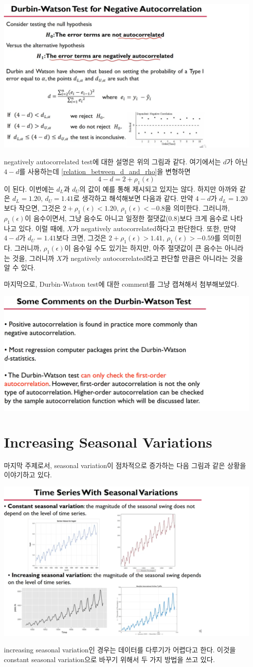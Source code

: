 \documentclass{article}
\begin{document}
\begin{center}
\includegraphics[width=.5\textwidth]{negatively_autocorrelated_test}
\end{center}

negatively autocorrelated test에 대한 설명은 위의 그림과 같다.
여기에서는 \(d\)가 아닌 \(4-d\)를 사용하는데 \eqref{relation_between_d_and_rho}을 변형하면
\[4-d=2+\rho_1(\epsilon)\]
이 된다.
이번에는 \(d_L\)과 \(d_U\)의 값이 예를 통해 제시되고 있지는 않다.
하지만 아까와 같은 \(d_L=1.20\), \(d_U=1.41\)로 생각하고 해석해보면 다음과 같다.
만약 \(4-d\)가 \(d_L=1.20\)보다 작으면, 그것은 \(2+\rho_1(\epsilon)<1.20\), \(\rho_1(\epsilon)<-0.8\)을 의미한다.
그러니까, \(\rho_1(\epsilon)\)이 음수이면서, 그냥 음수도 아니고 일정한 절댓값(0.8)보다 크게 음수로 나타나고 있다.
이럴 때에, \(X\)가 negatively autocorrelated하다고 판단한다.
또한, 만약 \(4-d\)가 \(d_U=1.41\)보다 크면, 그것은 \(2+\rho_1(\epsilon)>1.41\), \(\rho_1(\epsilon)>-0.59\)를 의미힌다.
그러니까, \(\rho_1(\epsilon)\)이 음수일 수도 있기는 하지만, 아주 절댓값이 큰 음수는 아니라는 것을, 그러니까 \(X\)가 negatively autocorrelated라고 판단할 만큼은 아니라는 것을 알 수 있다.

마지막으로, Durbin-Watson test에 대한 comment를 그냥 캡쳐해서 첨부해보았다.

\begin{center}
\includegraphics[width=.5\textwidth]{comment_on_DWtest}
\end{center}

\section{Increasing Seasonal Variations}
마지막 주제로서, seasonal variation이 점차적으로 증가하는 다음 그림과 같은 상황을 이야기하고 있다.
\begin{center}
\includegraphics[width=.5\textwidth]{increasing_seasonal_variation}
\end{center}
increasing seasonal variation인 경우는 데이터를 다루기가 어렵다고 한다.
이것을 constant seasonal variation으로 바꾸기 위해서 두 가지 방법을 쓰고 있다.
\end{document}
